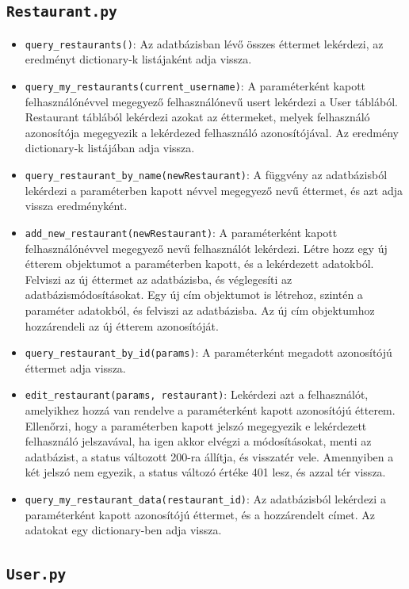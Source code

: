 \subsection{\texttt{Restaurant.py}}

\begin{itemize}
\item \texttt{query\_restaurants()}:
Az adatbázisban lévő összes éttermet lekérdezi, az eredményt dictionary-k listájaként adja vissza.
\item \texttt{query\_my\_restaurants(current\_username)}:
A paraméterként kapott felhasználónévvel megegyező felhasználónevű usert lekérdezi a User táblából. Restaurant táblából lekérdezi azokat az éttermeket, melyek felhasználó azonosítója megegyezik a lekérdezed felhasználó azonosítójával. Az eredmény dictionary-k listájában adja vissza.
\item \texttt{query\_restaurant\_by\_name(newRestaurant)}:
A függvény az adatbázisból lekérdezi a paraméterben kapott névvel megegyező nevű éttermet, és azt adja vissza eredményként.
\item \texttt{add\_new\_restaurant(newRestaurant)}:
A paraméterként kapott felhasználónévvel megegyező nevű felhasználót lekérdezi. Létre hozz egy új étterem objektumot a paraméterben kapott, és a lekérdezett adatokból. Felviszi az új éttermet az adatbázisba, és véglegesíti az adatbázismódosításokat. Egy új cím objektumot is létrehoz, szintén a paraméter adatokból, és felviszi az adatbázisba. Az új cím objektumhoz hozzárendeli az új étterem azonosítóját.
\item \texttt{query\_restaurant\_by\_id(params)}:
A paraméterként megadott azonosítójú éttermet adja vissza.
\item \texttt{edit\_restaurant(params, restaurant)}:
Lekérdezi azt a felhasználót, amelyikhez hozzá van rendelve a paraméterként kapott azonosítójú étterem. Ellenőrzi, hogy a paraméterben kapott jelszó megegyezik e lekérdezett felhasználó jelszavával, ha igen akkor elvégzi a módosításokat, menti az adatbázist, a status változott 200-ra állítja, és visszatér vele. Amennyiben a két jelszó nem egyezik, a status változó értéke 401 lesz, és azzal tér vissza.
\item \texttt{query\_my\_restaurant\_data(restaurant\_id)}:
Az adatbázisból lekérdezi a paraméterként kapott azonosítójú éttermet, és a hozzárendelt címet. Az adatokat egy dictionary-ben adja vissza.
\end{itemize}

\subsection{\texttt{User.py}}

